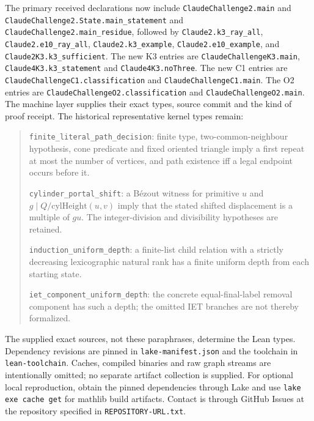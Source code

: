 \documentclass[11pt]{amsart}
\newcommand{\record}[1]{\nolinkurl{#1}}
\theoremstyle{definition}\newtheorem{definition}{Definition}
\begin{document}
The primary received declarations now include
\record{ClaudeChallenge2.main} and
\record{ClaudeChallenge2.State.main_statement} and
\record{ClaudeChallenge2.main_residue}, followed by
\record{Claude2.k3_ray_all}, \record{Claude2.e10_ray_all},
\record{Claude2.k3_example}, \record{Claude2.e10_example}, and
\record{Claude2K3.k3_sufficient}. The new K3 entries are
\record{ClaudeChallengeK3.main}, \record{Claude4K3.k3_statement} and
\record{Claude4K3.noThree}. The new C1 entries are
\record{ClaudeChallengeC1.classification} and \record{ClaudeChallengeC1.main}.
The O2 entries are \record{ClaudeChallengeO2.classification} and
\record{ClaudeChallengeO2.main}. The machine layer supplies their exact
types, source commit and the kind of proof receipt. The historical
representative kernel types remain:
\begin{quote}\small
\record{finite_literal_path_decision}: finite type, two-common-neighbour
hypothesis, cone predicate and fixed oriented triangle imply a first
repeat at most the number of vertices, and path existence iff a legal
endpoint occurs before it.\par
\record{cylinder_portal_shift}: a B\'ezout witness for primitive $u$
and $g\mid Q/\mathrm{cylHeight}(u,v)$ imply that the stated shifted
displacement is a multiple of $gu$. The integer-division and
divisibility hypotheses are retained.\par
\record{induction_uniform_depth}: a finite-list child relation with a
strictly decreasing lexicographic natural rank has a finite uniform
depth from each starting state.\par
\record{iet_component_uniform_depth}: the concrete equal-final-label
removal component has such a depth; the omitted IET branches are not
thereby formalized.
\end{quote}
The supplied exact sources, not these paraphrases, determine the Lean
types. Dependency revisions are pinned in \texttt{lake-manifest.json}
and the toolchain in \texttt{lean-toolchain}. Caches, compiled binaries
and raw graph streams are intentionally omitted; no separate artifact
collection is supplied. For optional local reproduction, obtain the pinned
dependencies through Lake and use \texttt{lake exe cache get} for mathlib
build artifacts. Contact is through GitHub Issues at the repository
specified in \texttt{REPOSITORY-URL.txt}.
\end{document}
